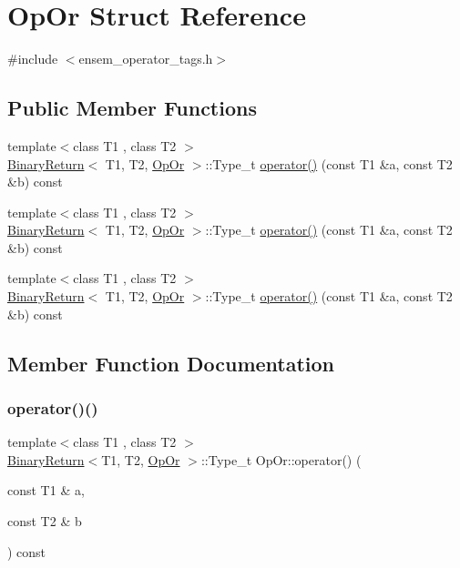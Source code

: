\hypertarget{structOpOr}{}\section{Op\+Or Struct Reference}
\label{structOpOr}


{\ttfamily \#include $<$ensem\+\_\+operator\+\_\+tags.\+h$>$}

\subsection*{Public Member Functions}
\begin{DoxyCompactItemize}
\item 
{\footnotesize template$<$class T1 , class T2 $>$ }\\\mbox{\hyperlink{structBinaryReturn}{Binary\+Return}}$<$ T1, T2, \mbox{\hyperlink{structOpOr}{Op\+Or}} $>$\+::Type\+\_\+t \mbox{\hyperlink{structOpOr_a01b11c55d051ff847a53aab673a65582}{operator()}} (const T1 \&a, const T2 \&b) const
\item 
{\footnotesize template$<$class T1 , class T2 $>$ }\\\mbox{\hyperlink{structBinaryReturn}{Binary\+Return}}$<$ T1, T2, \mbox{\hyperlink{structOpOr}{Op\+Or}} $>$\+::Type\+\_\+t \mbox{\hyperlink{structOpOr_a01b11c55d051ff847a53aab673a65582}{operator()}} (const T1 \&a, const T2 \&b) const
\item 
{\footnotesize template$<$class T1 , class T2 $>$ }\\\mbox{\hyperlink{structBinaryReturn}{Binary\+Return}}$<$ T1, T2, \mbox{\hyperlink{structOpOr}{Op\+Or}} $>$\+::Type\+\_\+t \mbox{\hyperlink{structOpOr_a01b11c55d051ff847a53aab673a65582}{operator()}} (const T1 \&a, const T2 \&b) const
\end{DoxyCompactItemize}


\subsection{Member Function Documentation}
\mbox{\label{structOpOr_a01b11c55d051ff847a53aab673a65582}} 
\subsubsection{\texorpdfstring{operator()()}{operator()()}\hspace{0.1cm}{\footnotesize\ttfamily [1/3]}}
{\footnotesize\ttfamily template$<$class T1 , class T2 $>$ \\
\mbox{\hyperlink{structBinaryReturn}{Binary\+Return}}$<$T1, T2, \mbox{\hyperlink{structOpOr}{Op\+Or}} $>$\+::Type\+\_\+t Op\+Or\+::operator() (\begin{DoxyParamCaption}\item[{const T1 \&}]{a,  }\item[{const T2 \&}]{b }\end{DoxyParamCaption}) const\hspace{0.3cm}{\ttfamily [inline]}}

